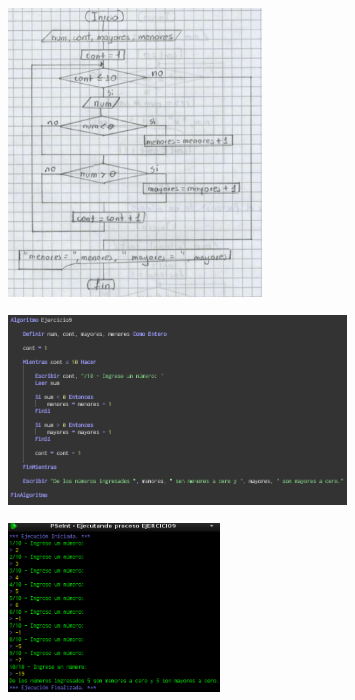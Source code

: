 \documentclass[12pt]{article}
\begin{document}
\begin{enumerate}
                \begin{figure}[!h]
                    \centering
                    \includegraphics[width=0.6\textwidth]{Img/DF_ej9.png}
                \end{figure}

                \begin{figure}[!h]
                    \centering
                    \includegraphics[width=0.8\textwidth]{Img/Cod_ej9.png}
                \end{figure}

                \newpage
                \begin{figure}[!h]
                    \centering
                    \includegraphics[width=0.5\textwidth]{Img/Ejec_ej9.png}
                \end{figure}
            

\end{enumerate}
\end{document}
